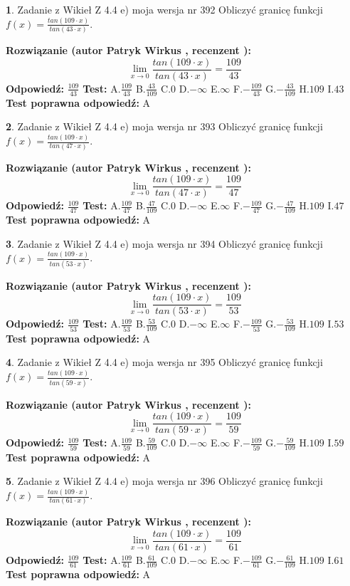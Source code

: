 \documentclass[12pt, a4paper]{article}
\theoremstyle{definition} %
\newtheorem{zad}{}
\newcommand{\zadStart}[1]{\begin{zad}#1\newline}
\newcommand{\zadStop}{\end{zad}}
\newcommand{\rozwStart}[2]{\noindent \textbf{Rozwiązanie (autor #1 , recenzent #2): }\newline}
\newcommand{\rozwStop}{\newline}
\newcommand{\odpStart}{\noindent \textbf{Odpowiedź:}\newline}
\newcommand{\odpStop}{\newline}
\newcommand{\testStart}{\noindent \textbf{Test:}\newline}
\newcommand{\testStop}{\newline}
\newcommand{\kluczStart}{\noindent \textbf{Test poprawna odpowiedź:}\newline}
\newcommand{\kluczStop}{\newline}
\begin{document}
\zadStart{Zadanie z Wikieł Z 4.4 e) moja wersja nr 392}
Obliczyć granicę funkcji $f(x)=\frac{tan(109\cdot x)}{tan(43\cdot x)}$.
\zadStop
\rozwStart{Patryk Wirkus}{}
$$\lim\limits_{x\to 0}\frac{tan(109\cdot x)}{tan(43\cdot x)}=
\frac{109}{43}$$
\rozwStop
\odpStart
$\frac{109}{43}$
\odpStop
\testStart
A.$\frac{109}{43}$
B.$\frac{43}{109}$
C.$0$
D.$-\infty$
E.$\infty$
F.$-\frac{109}{43}$
G.$-\frac{43}{109}$
H.$109$
I.$43$
\testStop
\kluczStart
A
\kluczStop



\zadStart{Zadanie z Wikieł Z 4.4 e) moja wersja nr 393}
Obliczyć granicę funkcji $f(x)=\frac{tan(109\cdot x)}{tan(47\cdot x)}$.
\zadStop
\rozwStart{Patryk Wirkus}{}
$$\lim\limits_{x\to 0}\frac{tan(109\cdot x)}{tan(47\cdot x)}=
\frac{109}{47}$$
\rozwStop
\odpStart
$\frac{109}{47}$
\odpStop
\testStart
A.$\frac{109}{47}$
B.$\frac{47}{109}$
C.$0$
D.$-\infty$
E.$\infty$
F.$-\frac{109}{47}$
G.$-\frac{47}{109}$
H.$109$
I.$47$
\testStop
\kluczStart
A
\kluczStop



\zadStart{Zadanie z Wikieł Z 4.4 e) moja wersja nr 394}
Obliczyć granicę funkcji $f(x)=\frac{tan(109\cdot x)}{tan(53\cdot x)}$.
\zadStop
\rozwStart{Patryk Wirkus}{}
$$\lim\limits_{x\to 0}\frac{tan(109\cdot x)}{tan(53\cdot x)}=
\frac{109}{53}$$
\rozwStop
\odpStart
$\frac{109}{53}$
\odpStop
\testStart
A.$\frac{109}{53}$
B.$\frac{53}{109}$
C.$0$
D.$-\infty$
E.$\infty$
F.$-\frac{109}{53}$
G.$-\frac{53}{109}$
H.$109$
I.$53$
\testStop
\kluczStart
A
\kluczStop



\zadStart{Zadanie z Wikieł Z 4.4 e) moja wersja nr 395}
Obliczyć granicę funkcji $f(x)=\frac{tan(109\cdot x)}{tan(59\cdot x)}$.
\zadStop
\rozwStart{Patryk Wirkus}{}
$$\lim\limits_{x\to 0}\frac{tan(109\cdot x)}{tan(59\cdot x)}=
\frac{109}{59}$$
\rozwStop
\odpStart
$\frac{109}{59}$
\odpStop
\testStart
A.$\frac{109}{59}$
B.$\frac{59}{109}$
C.$0$
D.$-\infty$
E.$\infty$
F.$-\frac{109}{59}$
G.$-\frac{59}{109}$
H.$109$
I.$59$
\testStop
\kluczStart
A
\kluczStop



\zadStart{Zadanie z Wikieł Z 4.4 e) moja wersja nr 396}
Obliczyć granicę funkcji $f(x)=\frac{tan(109\cdot x)}{tan(61\cdot x)}$.
\zadStop
\rozwStart{Patryk Wirkus}{}
$$\lim\limits_{x\to 0}\frac{tan(109\cdot x)}{tan(61\cdot x)}=
\frac{109}{61}$$
\rozwStop
\odpStart
$\frac{109}{61}$
\odpStop
\testStart
A.$\frac{109}{61}$
B.$\frac{61}{109}$
C.$0$
D.$-\infty$
E.$\infty$
F.$-\frac{109}{61}$
G.$-\frac{61}{109}$
H.$109$
I.$61$
\testStop
\kluczStart
A
\kluczStop
\end{document}
